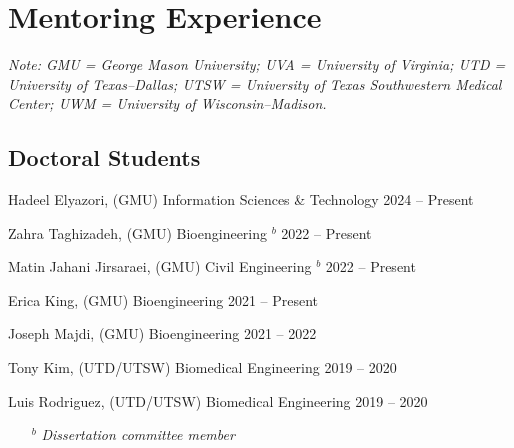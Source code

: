 \documentclass[letterpaper, 10pt]{article}
\begin{document}
\section{Mentoring Experience}

\begin{itemize}
\end{itemize}

\subsection{\textbf{Doctoral Students}} %
\begin{compacthang}
     \item Hadeel Elyazori, (GMU) Information Sciences \& Technology \hfill 2024 -- Present
     \item Zahra Taghizadeh, (GMU) Bioengineering $^{b}$ \hfill 2022 -- Present
	\item Matin Jahani Jirsaraei, (GMU) Civil Engineering $^{b}$ \hfill 2022 -- Present
	\item Erica King, (GMU) Bioengineering \hfill 2021 -- Present
	\item Joseph Majdi, (GMU) Bioengineering \hfill 2021 -- 2022
	\item Tony Kim, (UTD/UTSW) Biomedical Engineering \hfill 2019 -- 2020
	\item Luis Rodriguez, (UTD/UTSW) Biomedical Engineering \hfill 2019 -- 2020
     \begin{itemize}
	     \item[$^{b}$] \textit{Dissertation committee member}
     \end{itemize}	
\end{compacthang}
\end{document}

